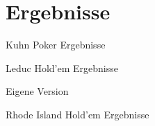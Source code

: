 \section{Ergebnisse}
Kuhn Poker Ergebnisse

Leduc Hold'em Ergebnisse

Eigene Version

Rhode Island Hold'em Ergebnisse


